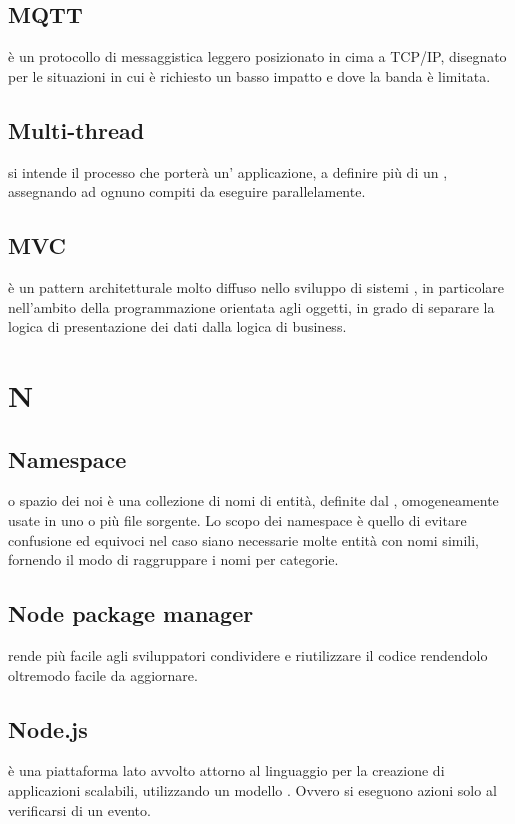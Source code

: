 \documentclass[12pt,a4paper]{article}
\begin{document}
\subsection{MQTT} 
 è un protocollo di messaggistica leggero posizionato in cima a TCP/IP, disegnato per le situazioni in cui è richiesto un basso impatto e dove la banda è limitata.

\subsection{Multi-thread} 
 si intende il processo che porterà un' applicazione, a definire più di un , assegnando ad ognuno compiti da eseguire parallelamente.

\subsection{MVC} 
 è un pattern architetturale molto diffuso nello sviluppo di sistemi , in particolare nell'ambito della programmazione orientata agli oggetti, in grado di separare la logica di presentazione dei dati dalla logica di business.


\newpage

\section{N}

\subsection{Namespace} 
 o spazio dei noi è una collezione di nomi di entità, definite dal , omogeneamente usate in uno o più file sorgente. Lo scopo dei namespace è quello di evitare confusione ed equivoci nel caso siano necessarie molte entità con nomi simili, fornendo il modo di raggruppare i nomi per categorie.

\subsection{Node package manager} 
 rende più facile agli sviluppatori  condividere e riutilizzare il codice rendendolo oltremodo facile da aggiornare.

\subsection{Node.js} 
 è una piattaforma lato  avvolto attorno al linguaggio  per la creazione di applicazioni scalabili, utilizzando un modello . Ovvero si eseguono azioni solo al verificarsi di un evento.
\end{document}
